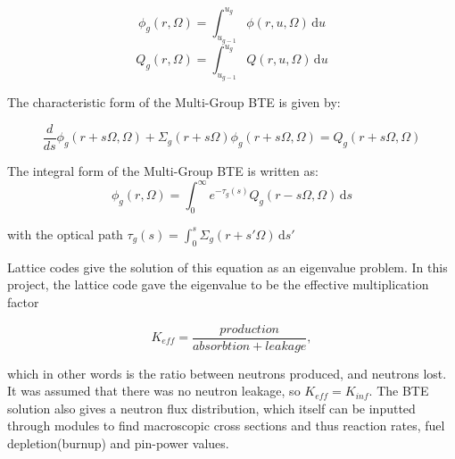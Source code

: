 \documentclass[12pt]{article}
\begin{document}
\begin{equation}
    \phi_g(r, \Omega) = \int_{u_{g-1}}^{u_g} \! \phi(r, u, \Omega) \, \mathrm{d}u
\end{equation}
\begin{equation}
    Q_g(r, \Omega) = \int_{u_{g-1}}^{u_g} \! Q(r, u, \Omega) \, \mathrm{d}u
\end{equation}
 
 The characteristic form of the Multi-Group BTE is given by:
 
 \begin{equation}
     \frac{d}{ds}\phi_g(r + s\Omega, \Omega) + \Sigma_g(r + s\Omega)\phi_g(r + s\Omega, \Omega) = Q_g(r + s\Omega, \Omega)
 \end{equation}
 
 The integral form of the Multi-Group BTE is written as: 
 \begin{equation}
     \phi_g(r, \Omega) = \int_0^{\infty} \! e^{-\tau_g(s)}Q_g(r - s\Omega, \Omega) \, \mathrm{d}s
 \end{equation}
 
 with the optical path $\tau_g(s) =  \int_0^s \! \Sigma_g(r + s' \Omega) \, \mathrm{d}s'$  

Lattice codes give the solution of this equation as an eigenvalue problem. In this project, the lattice code gave the eigenvalue to be the effective multiplication factor 

\begin{equation}
    K_{eff} = \frac{production}{absorbtion+leakage},
\end{equation}

which in other words is the ratio between neutrons produced, and neutrons lost. It was assumed that there was no neutron leakage, so $K_{eff} = K_{inf}$. The BTE solution also gives a neutron flux distribution, which itself can be inputted through modules to find macroscopic cross sections and thus reaction rates, fuel depletion(burnup) and pin-power values. 
\end{document}
